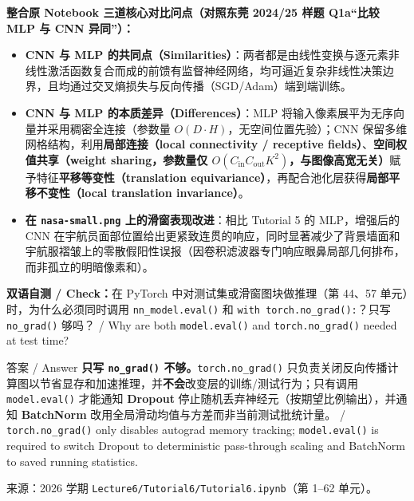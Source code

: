 \textbf{整合原 Notebook 三道核心对比问点（对照东莞 2024/25 样题 Q1a“比较 MLP 与 CNN 异同”）：}
\begin{itemize}
\item \textbf{CNN 与 MLP 的共同点（Similarities）}：两者都是由线性变换与逐元素非线性激活函数复合而成的前馈有监督神经网络，均可逼近复杂非线性决策边界，且均通过交叉熵损失与反向传播（SGD/Adam）端到端训练。
\item \textbf{CNN 与 MLP 的本质差异（Differences）}：MLP 将输入像素展平为无序向量并采用稠密全连接（参数量 $O(D\cdot H)$，无空间位置先验）；CNN 保留多维网格结构，利用\textbf{局部连接（local connectivity / receptive fields）}、\textbf{空间权值共享（weight sharing，参数量仅 $O(C_{\mathrm{in}}C_{\mathrm{out}}K^2)$，与图像高宽无关）}赋予特征\textbf{平移等变性（translation equivariance）}，再配合池化层获得\textbf{局部平移不变性（local translation invariance）}。
\item \textbf{在 \texttt{nasa-small.png} 上的滑窗表现改进}：相比 Tutorial 5 的 MLP，增强后的 CNN 在宇航员面部位置给出更紧致连贯的响应，同时显著减少了背景墙面和宇航服褶皱上的零散假阳性误报（因卷积滤波器专门响应眼鼻局部几何排布，而非孤立的明暗像素和）。
\end{itemize}

\textbf{双语自测 / Check：}在 PyTorch 中对测试集或滑窗图块做推理（第 44、57 单元）时，为什么必须同时调用 \texttt{nn\_model.eval()} 和 \texttt{with torch.no\_grad():}？只写 \texttt{no\_grad()} 够吗？ / Why are both \texttt{model.eval()} and \texttt{torch.no\_grad()} needed at test time?

\begin{StudySolution}{答案 / Answer}
\textbf{只写 \texttt{no\_grad()} 不够。}\texttt{torch.no\_grad()} 只负责关闭反向传播计算图以节省显存和加速推理，并\textbf{不会}改变层的训练/测试行为；只有调用 \texttt{model.eval()} 才能通知 \textbf{Dropout} 停止随机丢弃神经元（按期望比例输出），并通知 \textbf{BatchNorm} 改用全局滑动均值与方差而非当前测试批统计量。 / \texttt{torch.no\_grad()} only disables autograd memory tracking; \texttt{model.eval()} is required to switch Dropout to deterministic pass-through scaling and BatchNorm to saved running statistics.
\end{StudySolution}

来源：2026 学期 \texttt{Lecture6/Tutorial6/Tutorial6.ipynb}（第 1–62 单元）。
